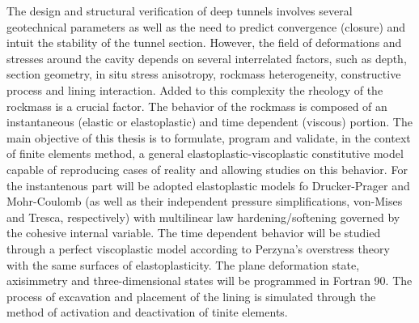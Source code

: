 The design and structural verification of deep tunnels involves several geotechnical parameters as well as the need to predict convergence (closure) and intuit the stability of the tunnel section. However, the field of deformations and stresses around the cavity depends on several interrelated factors, such as depth, section geometry, in situ stress anisotropy, rockmass heterogeneity, constructive process and lining interaction. Added to this complexity the rheology of the rockmass is a crucial factor. The behavior of the rockmass is composed of an instantaneous (elastic or elastoplastic) and time dependent (viscous) portion. The main objective of this thesis is to formulate, program and validate, in the context of finite elements method, a general elastoplastic-viscoplastic constitutive model capable of reproducing cases of reality and allowing studies on this behavior. For the instantenous part will be adopted elastoplastic models fo Drucker-Prager and Mohr-Coulomb (as well as their independent pressure simplifications, von-Mises and Tresca, respectively) with multilinear law hardening/softening governed by the cohesive internal variable. The time dependent behavior will be studied through a perfect viscoplastic model according to Perzyna’s overstress theory with the same surfaces of elastoplasticity. The plane deformation state, axisimmetry and three-dimensional states will be programmed in Fortran 90. The process of excavation and placement of the lining is simulated through the method of activation and deactivation of tinite elements.
